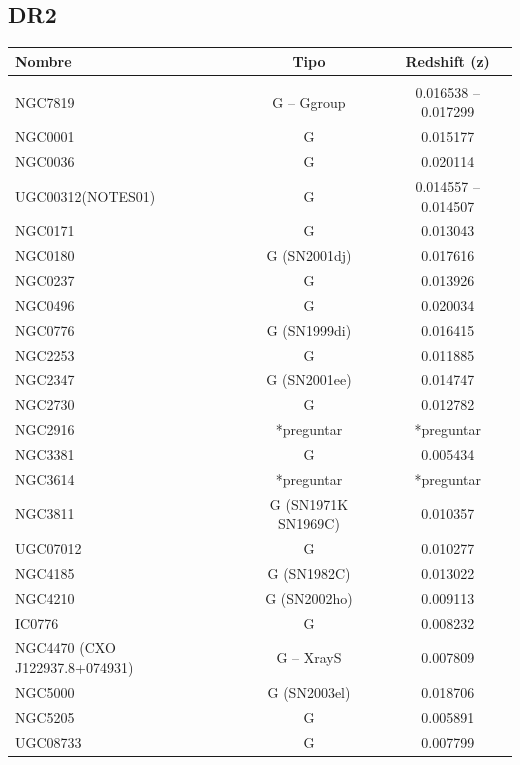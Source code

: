 \documentclass[9pt]{revtex4-1}
\begin{document}
\clearpage

\begin{@twocolumnfalse}

\onecolumngrid

\section{DR2}
 \begin{center}
 \begin{tabular}{ l c c }
 
 Nombre & Tipo & Redshift (z) \\
 \hline
 \hline \\
 
 
 NGC7819 & G -- Ggroup & 0.016538 -- 0.017299 \\ %
 NGC0001 & G & 0.015177 \\ %
 NGC0036 & G & 0.020114 \\ %
 UGC00312(NOTES01) & G & 0.014557 -- 0.014507 \\ %
 NGC0171 & G & 0.013043 \\ %
 NGC0180 & G (SN2001dj) & 0.017616 \\ %
 NGC0237 & G & 0.013926 \\ %
 NGC0496 & G & 0.020034 \\ %
 NGC0776 & G (SN1999di) & 0.016415 \\ %
 NGC2253 & G & 0.011885 \\ %
 NGC2347 & G (SN2001ee) & 0.014747 \\ %
 NGC2730 & G & 0.012782 \\ %
 NGC2916 & *preguntar & *preguntar \\ %
 NGC3381 & G & 0.005434 \\ %
 NGC3614 & *preguntar & *preguntar \\ %
 NGC3811 & G (SN1971K SN1969C) & 0.010357 \\ %
 UGC07012 & G & 0.010277 \\ %
 NGC4185 & G (SN1982C) & 0.013022 \\ %
 NGC4210 & G (SN2002ho) & 0.009113 \\ %
 IC0776  & G & 0.008232 \\ %
 NGC4470 (CXO J122937.8+074931) & G -- XrayS & 0.007809 \\ %
 NGC5000 & G (SN2003el) & 0.018706 \\ %
 NGC5205 & G & 0.005891 \\ %
 UGC08733 & G & 0.007799 \\ %

\end{tabular}
\end{center}
\end{@twocolumnfalse}
\end{document}
